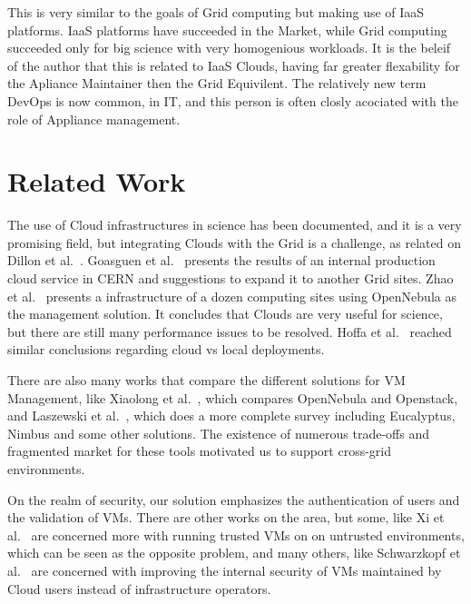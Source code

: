 \documentclass{llncs_Ibergrid2013}
\begin{document}
This is very similar to the goals of Grid computing but making use of IaaS platforms. IaaS platforms have succeeded in the Market, while Grid computing succeeded only for big science with very homogenious workloads. It is the beleif of the author that this is related to IaaS Clouds, having far greater flexability for the Apliance Maintainer then the Grid Equivilent. The relatively new term DevOps is now common, in IT, and this person is often closly acociated with the role of Appliance management.
\section{Related Work}
\label{sect-relatedwork}
The use of Cloud infrastructures in science has been documented, and it is a very promising field, but integrating Clouds with the Grid is a challenge, as related on Dillon et al.~\cite{Dillon2010}. Goasguen et al.~\cite{Goasguen2012} presents the results of an internal production cloud service in CERN and suggestions to expand it to another Grid sites. Zhao et al.~\cite{Zhao2012} presents a infrastructure of a dozen computing sites using OpenNebula as the management solution. It concludes that Clouds are very useful for science, but there are still many performance issues to be resolved. Hoffa et al.~\cite{Hoffa2008} reached similar conclusions regarding cloud vs local deployments.

There are also many works that compare the different solutions for VM Management, like Xiaolong et al.~\cite{Xiaolong2012}, which compares OpenNebula and Openstack, and Laszewski et al.~\cite{Laszewski2012}, which does a more complete survey including Eucalyptus, Nimbus and some other solutions. The existence of numerous trade-offs and fragmented market for these tools motivated us to support cross-grid environments.

On the realm of security, our solution emphasizes the authentication of users and the validation of VMs. There are other works on the area, but some, like Xi et al.~\cite{Xi2012} are concerned more with running trusted VMs on on untrusted environments, which can be seen as the opposite problem, and many others, like Schwarzkopf et al.~\cite{Schwarzkopf2012} are concerned with improving the internal security of VMs maintained by Cloud users instead of infrastructure operators.
\end{document}
